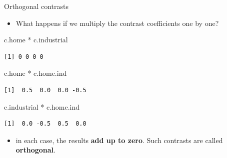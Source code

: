 \documentclass[
  ignorenonframetext,
]{beamer}
\newenvironment{Shaded}{\begin{snugshade}}{\end{snugshade}}
\newcommand{\NormalTok}[1]{\textcolor[rgb]{0.00,0.23,0.31}{#1}}
\newcommand{\SpecialCharTok}[1]{\textcolor[rgb]{0.37,0.37,0.37}{#1}}
\providecommand{\tightlist}{%
  \setlength{\itemsep}{0pt}\setlength{\parskip}{0pt}}\usepackage{longtable,booktabs,array}
\begin{document}
\begin{frame}[fragile]{Orthogonal contrasts}
\protect\hypertarget{orthogonal-contrasts}{}
\begin{itemize}
\tightlist
\item
  What happens if we multiply the contrast coefficients one by one?
\end{itemize}

\begin{Shaded}
\begin{Highlighting}[]
\NormalTok{c.home }\SpecialCharTok{*}\NormalTok{ c.industrial}
\end{Highlighting}
\end{Shaded}

\begin{verbatim}
[1] 0 0 0 0
\end{verbatim}

\begin{Shaded}
\begin{Highlighting}[]
\NormalTok{c.home }\SpecialCharTok{*}\NormalTok{ c.home.ind}
\end{Highlighting}
\end{Shaded}

\begin{verbatim}
[1]  0.5  0.0  0.0 -0.5
\end{verbatim}

\begin{Shaded}
\begin{Highlighting}[]
\NormalTok{c.industrial }\SpecialCharTok{*}\NormalTok{ c.home.ind}
\end{Highlighting}
\end{Shaded}

\begin{verbatim}
[1]  0.0 -0.5  0.5  0.0
\end{verbatim}

\begin{itemize}
\tightlist
\item
  in each case, the results \textbf{add up to zero}. Such contrasts are
  called \textbf{orthogonal}.
\end{itemize}
\end{frame}
\end{document}
